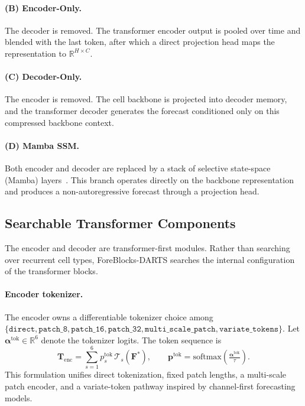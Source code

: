 \paragraph{(B) Encoder-Only.}
The decoder is removed. The transformer encoder output is pooled over time and
blended with the last token, after which a direct projection head maps the
representation to $\mathbb{R}^{H \times C}$.

\paragraph{(C) Decoder-Only.}
The encoder is removed. The cell backbone is projected into decoder memory,
and the transformer decoder generates the forecast conditioned only on this
compressed backbone context.

\paragraph{(D) Mamba SSM.}
Both encoder and decoder are replaced by a stack of selective state-space
(Mamba) layers~\citep{gu2023mamba}. This branch operates directly on the
backbone representation and produces a non-autoregressive forecast through a
projection head.

\subsection{Searchable Transformer Components}
\label{sec:transformers}

The encoder and decoder are transformer-first modules. Rather than searching
over recurrent cell types, ForeBlocks-DARTS searches the internal
configuration of the transformer blocks.

\paragraph{Encoder tokenizer.}
The encoder owns a differentiable tokenizer choice among
$\{\texttt{direct},\texttt{patch\_8},\texttt{patch\_16},
\texttt{patch\_32},\texttt{multi\_scale\_patch},
\texttt{variate\_tokens}\}$. Let
$\boldsymbol{\alpha}^{\mathrm{tok}} \in \mathbb{R}^{6}$ denote the tokenizer
logits. The token sequence is
%
\begin{equation}
    \mathbf{T}_{\mathrm{enc}} = \sum_{s=1}^{6}
      p^{\mathrm{tok}}_s\,\mathcal{T}_s(\mathbf{F}^*),
    \qquad
    \mathbf{p}^{\mathrm{tok}} =
    \mathrm{softmax}\!\left(\tfrac{\boldsymbol{\alpha}^{\mathrm{tok}}}{\tau}\right).
    \label{eq:tokenizer}
\end{equation}
%
This formulation unifies direct tokenization, fixed patch lengths, a
multi-scale patch encoder, and a variate-token pathway inspired by
channel-first forecasting models.

